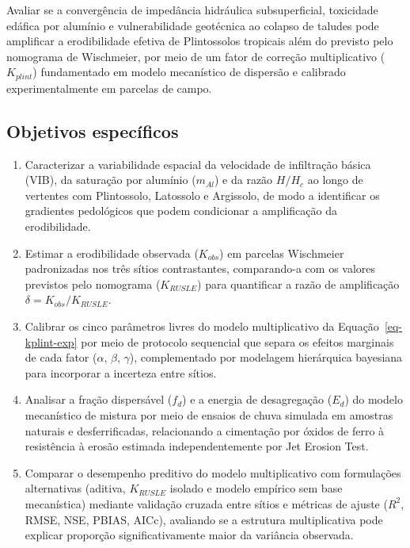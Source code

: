 \documentclass[
  brazilian,
  authoryear,
  preprint]{elsarticle}
\providecommand{\tightlist}{%
  \setlength{\itemsep}{0pt}\setlength{\parskip}{0pt}}
\begin{document}
Avaliar se a convergência de impedância hidráulica subsuperficial,
toxicidade edáfica por alumínio e vulnerabilidade geotécnica ao colapso
de taludes pode amplificar a erodibilidade efetiva de Plintossolos
tropicais além do previsto pelo nomograma de Wischmeier, por meio de um
fator de correção multiplicativo (\(K_{plint}\)) fundamentado em modelo
mecanístico de dispersão e calibrado experimentalmente em parcelas de
campo.

\subsection{Objetivos específicos}\label{objetivos-especuxedficos}

\begin{enumerate}
\def\labelenumi{\arabic{enumi}.}
\tightlist
\item
  Caracterizar a variabilidade espacial da velocidade de infiltração
  básica (VIB), da saturação por alumínio (\(m_{Al}\)) e da razão
  \(H/H_c\) ao longo de vertentes com Plintossolo, Latossolo e
  Argissolo, de modo a identificar os gradientes pedológicos que podem
  condicionar a amplificação da erodibilidade.
\item
  Estimar a erodibilidade observada (\(K_{obs}\)) em parcelas Wischmeier
  padronizadas nos três sítios contrastantes, comparando-a com os
  valores previstos pelo nomograma (\(K_{RUSLE}\)) para quantificar a
  razão de amplificação \(\delta = K_{obs}/K_{RUSLE}\).
\item
  Calibrar os cinco parâmetros livres do modelo multiplicativo da
  Equação~\ref{eq-kplint-exp} por meio de protocolo sequencial que
  separa os efeitos marginais de cada fator (\(\alpha\), \(\beta\),
  \(\gamma\)), complementado por modelagem hierárquica bayesiana para
  incorporar a incerteza entre sítios.
\item
  Analisar a fração dispersável (\(f_d\)) e a energia de desagregação
  (\(E_d\)) do modelo mecanístico de mistura por meio de ensaios de
  chuva simulada em amostras naturais e desferrificadas, relacionando a
  cimentação por óxidos de ferro à resistência à erosão estimada
  independentemente por Jet Erosion Test.
\item
  Comparar o desempenho preditivo do modelo multiplicativo com
  formulações alternativas (aditiva, \(K_{RUSLE}\) isolado e modelo
  empírico sem base mecanística) mediante validação cruzada entre sítios
  e métricas de ajuste (\(R^2\), RMSE, NSE, PBIAS, AICc), avaliando se a
  estrutura multiplicativa pode explicar proporção significativamente
  maior da variância observada.
\end{enumerate}
\end{document}
